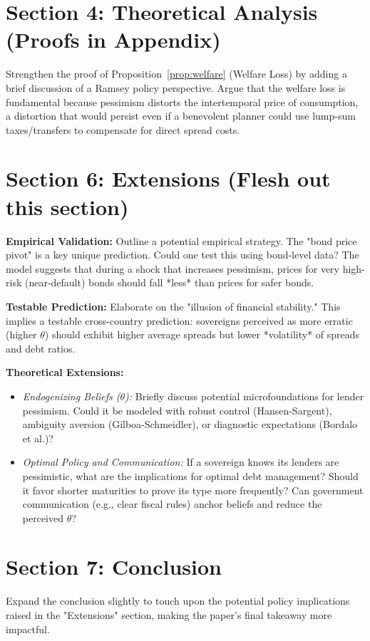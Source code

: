\documentclass[12pt]{article}
\begin{document}
\section{Section 4: Theoretical Analysis (Proofs in Appendix)}
\begin{todolist}
    \item Strengthen the proof of Proposition~\ref{prop:welfare} (Welfare Loss) by adding
    a brief discussion of a Ramsey policy perspective. Argue that the welfare loss
    is fundamental because pessimism distorts the intertemporal price of
    consumption, a distortion that would persist even if a benevolent planner could
    use lump-sum taxes/transfers to compensate for direct spread costs.
\end{todolist}

\section{Section 6: Extensions (Flesh out this section)}
\begin{todolist}
    \item \textbf{Empirical Validation:} Outline a potential empirical strategy. The "bond price pivot" is a key unique prediction. Could one test this using bond-level data? The model suggests that during a shock that increases pessimism, prices for very high-risk (near-default) bonds should fall *less* than prices for safer bonds.
    \item \textbf{Testable Prediction:} Elaborate on the "illusion of financial stability." This implies a testable cross-country prediction: sovereigns perceived as more erratic (higher $\theta$) should exhibit higher average spreads but lower *volatility* of spreads and debt ratios.
    \item \textbf{Theoretical Extensions:}
    \begin{itemize}
        \item \textit{Endogenizing Beliefs ($\theta$):} Briefly discuss potential microfoundations for lender pessimism. Could it be modeled with robust control (Hansen-Sargent), ambiguity aversion (Gilboa-Schmeidler), or diagnostic expectations (Bordalo et al.)?
        \item \textit{Optimal Policy and Communication:} If a sovereign knows its lenders are pessimistic, what are the implications for optimal debt management? Should it favor shorter maturities to prove its type more frequently? Can government communication (e.g., clear fiscal rules) anchor beliefs and reduce the perceived $\theta$?
    \end{itemize}
\end{todolist}

\section{Section 7: Conclusion}
\begin{todolist}
    \item Expand the conclusion slightly to touch upon the potential policy implications
    raised in the "Extensions" section, making the paper's final takeaway more
    impactful.
\end{todolist}
\end{document}
